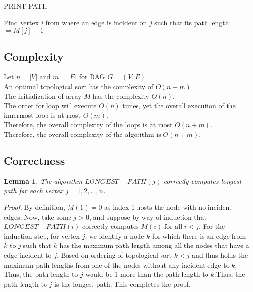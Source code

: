 \documentclass{article}
\theoremstyle{definition}
\theoremstyle{remark}
\theoremstyle{plain}
\newtheorem{lem}[thm]{Lemma}
\begin{document}
\begin{algorithm}
\caption{PRINT PATH}\label{Prints the longest path in a DAG}
\begin{algorithmic}[1]
 
		\State \Return
	\Else
		\State {}
		\State Find vertex $i$ from where an edge is incident on $j$ such that its path length $= M[j] -1$
		\State {}
		\State \Return
	\EndIf
\EndProcedure
\end{algorithmic}
\end{algorithm}


\pagebreak

\subsection*{Complexity}
Let $n = |V|$ and $m = |E|$ for DAG $G = (V,E)$\\
An optimal topological sort has the complexity of $O(n+m)$.\\
The initialization of array $M$ has the complexity $O(n)$.\\
The outer for loop will execute $O(n)$ times, yet the overall execution of the innermost loop is at most $O(m)$.\\
Therefore, the overall complexity of the loops is at most $O(n+m)$.\\
Therefore, the overall complexity of the algorithm is $O(n+m)$.

\subsection*{Correctness}

\begin{lem}
The algorithm $LONGEST-PATH(j)$ correctly computes longest path for each vertex $j = 1,2,\ldots,n$.
\end{lem}
\begin{proof}
By definition, $M(1) = 0$ as index 1 hosts the node with no incident edges.  Now, take some $j > 0$, and suppose by way of induction that $LONGEST-PATH(i)$ correctly computes $M(i)$ for all $i < j$. For the induction step, for vertex $j$, we identify a node $k$ for which there is an edge from $k$ to $j$ such that $k$ has the maximum path length among all the nodes that have a edge incident to $j$.  Based on ordering of topological sort $k < j$ and thus holds the maximum path lengths from one of the nodes without any incident edge to $k$. Thus, the path length to $j$ would be 1 more than the path length to $k$.Thus, the path length to $j$ is the longest path.  This completes the proof.
\end{proof}
\end{document}
